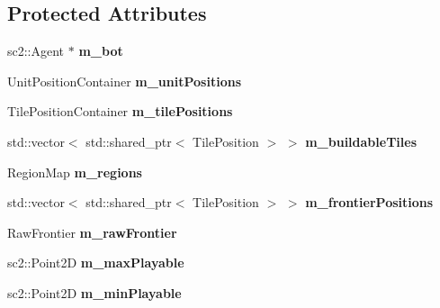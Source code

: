 \subsection*{Protected Attributes}
\begin{DoxyCompactItemize}
\item 
sc2\+::\+Agent $\ast$ {\bfseries m\+\_\+bot}\hypertarget{classOverseer_1_1Map_a334ebcf2176817b4754911930dc5164e}{}\label{classOverseer_1_1Map_a334ebcf2176817b4754911930dc5164e}

\item 
Unit\+Position\+Container {\bfseries m\+\_\+unit\+Positions}\hypertarget{classOverseer_1_1Map_ac1e5514d3ddcfc418d5d1d7dac9e5213}{}\label{classOverseer_1_1Map_ac1e5514d3ddcfc418d5d1d7dac9e5213}

\item 
Tile\+Position\+Container {\bfseries m\+\_\+tile\+Positions}\hypertarget{classOverseer_1_1Map_ab2053a78e25fe4f3198ca63e0512ed69}{}\label{classOverseer_1_1Map_ab2053a78e25fe4f3198ca63e0512ed69}

\item 
std\+::vector$<$ std\+::shared\+\_\+ptr$<$ Tile\+Position $>$ $>$ {\bfseries m\+\_\+buildable\+Tiles}\hypertarget{classOverseer_1_1Map_a065b5150f280192f1447a9710b31b8ae}{}\label{classOverseer_1_1Map_a065b5150f280192f1447a9710b31b8ae}

\item 
Region\+Map {\bfseries m\+\_\+regions}\hypertarget{classOverseer_1_1Map_a450b4ef1ab3b6721011d76c20ab11af3}{}\label{classOverseer_1_1Map_a450b4ef1ab3b6721011d76c20ab11af3}

\item 
std\+::vector$<$ std\+::shared\+\_\+ptr$<$ Tile\+Position $>$ $>$ {\bfseries m\+\_\+frontier\+Positions}\hypertarget{classOverseer_1_1Map_a27bd6d65d0012db2c73b5c4bdf44fd6b}{}\label{classOverseer_1_1Map_a27bd6d65d0012db2c73b5c4bdf44fd6b}

\item 
Raw\+Frontier {\bfseries m\+\_\+raw\+Frontier}\hypertarget{classOverseer_1_1Map_a733ab6c5a8f43f4adb14159f10303e49}{}\label{classOverseer_1_1Map_a733ab6c5a8f43f4adb14159f10303e49}

\item 
sc2\+::\+Point2D {\bfseries m\+\_\+max\+Playable}\hypertarget{classOverseer_1_1Map_ac9b4cb658ce3dd3192244ea3f0c46f2a}{}\label{classOverseer_1_1Map_ac9b4cb658ce3dd3192244ea3f0c46f2a}

\item 
sc2\+::\+Point2D {\bfseries m\+\_\+min\+Playable}\hypertarget{classOverseer_1_1Map_a89e153ba6ab77c08f9e983db0f392a64}{}\label{classOverseer_1_1Map_a89e153ba6ab77c08f9e983db0f392a64}


\end{DoxyCompactItemize}
